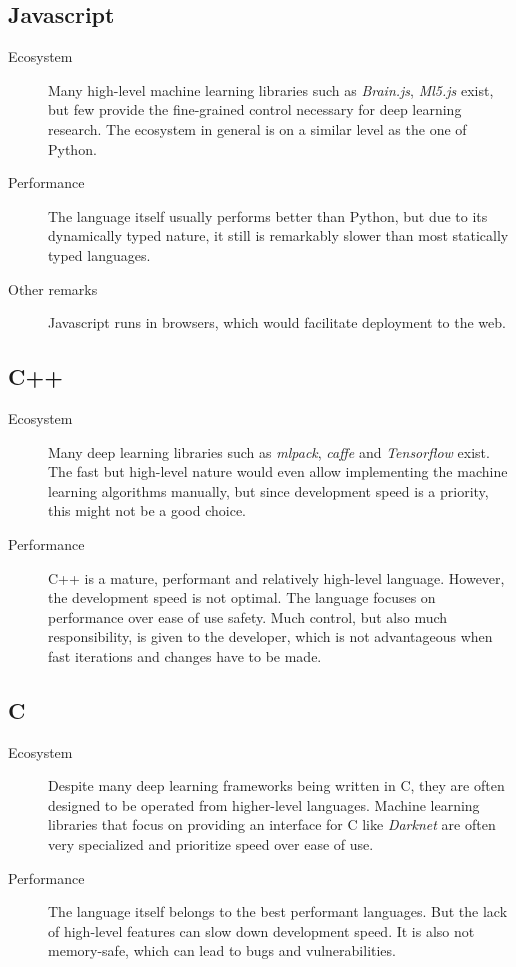 \documentclass[12pt, a4paper, titlepage]{report}
\begin{document}
{
   \center
   \subsection*{Javascript}
}
\begin{description}
   \item[Ecosystem] Many high-level machine learning libraries such as \emph{Brain.js}, \emph{Ml5.js} exist, but few provide the fine-grained control necessary for deep learning research. The ecosystem in general is on a similar level as the one of Python.
   \item[Performance] The language itself usually performs better than Python, but due to its dynamically typed nature, it still is remarkably slower than most statically typed languages.
   \item[Other remarks] Javascript runs in browsers, which would facilitate deployment to the web.
\end{description}

{
   \center
   \subsection*{C++}
}
\begin{description}
   \item[Ecosystem] Many deep learning libraries such as \emph{mlpack}, \emph{caffe} and \emph{Tensorflow} exist. The fast but high-level nature would even allow implementing the machine learning algorithms manually, but since development speed is a priority, this might not be a good choice.
   \item[Performance] C++ is a mature, performant and relatively high-level language. However, the development speed is not optimal. The language focuses on performance over ease of use safety. Much control, but also much responsibility, is given to the developer, which is not advantageous when fast iterations and changes have to be made.
\end{description}

{
   \center
   \subsection*{C}
}
\begin{description}
   \item[Ecosystem] Despite many deep learning frameworks being written in C, they are often designed to be operated from higher-level languages. Machine learning libraries that focus on providing an interface for C like \emph{Darknet} are often very specialized and prioritize speed over ease of use.
   \item[Performance] The language itself belongs to the best performant languages. But the lack of high-level features can slow down development speed. It is also not memory-safe, which can lead to bugs and vulnerabilities.
\end{description}
\end{document}
